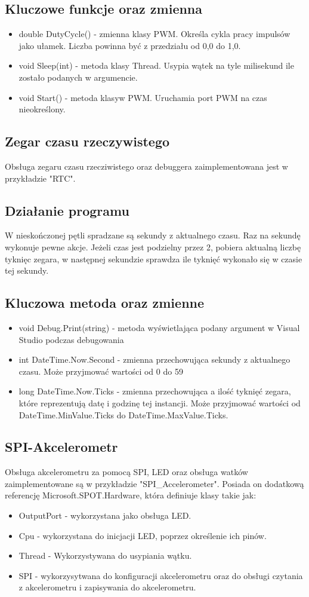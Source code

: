 \documentclass{article}
\begin{document}
\subsection*{Kluczowe funkcje oraz zmienna}
\begin{itemize}
\item double DutyCycle() - zmienna klasy PWM. Określa cykla pracy impulsów jako ułamek. Liczba powinna być z przedziału od 0,0 do 1,0.
\item void Sleep(int) - metoda klasy Thread. Usypia wątek na tyle milisekund ile zostało podanych w argumencie.
\item void Start() - metoda klasyw PWM. Uruchamia port PWM na czas nieokreślony.
\end{itemize}
\subsection{Zegar czasu rzeczywistego}
Obsługa zegaru czasu rzecziwistego oraz debuggera zaimplementowana jest w przykładzie "RTC".
\subsection*{Działanie programu}
W nieskończonej pętli spradzane są sekundy z aktualnego czasu. Raz na sekundę wykonuje pewne akcje. Jeżeli czas jest podzielny przez 2, pobiera aktualną liczbę tyknięc zegara, w następnej sekundzie sprawdza ile tyknięć wykonało się w czasie tej sekundy. 
\subsection*{Kluczowa metoda oraz zmienne}
\begin{itemize}
\item void Debug.Print(string) - metoda wyświetlająca podany argument w Visual Studio podczas debugowania
\item int DateTime.Now.Second - zmienna przechowująca sekundy z aktualnego czasu. Może przyjmować wartości od 0 do 59
\item long DateTime.Now.Ticks - zmienna przechowująca a ilość tyknięć zegara, które reprezentują datę i godzinę tej instancji. Może przyjmować wartości od DateTime.MinValue.Ticks do DateTime.MaxValue.Ticks.
\end{itemize}
\subsection{SPI-Akcelerometr}
Obsługa akcelerometru za pomocą SPI, LED oraz obsługa watków zaimplementowane są w przykładzie "SPI\_Accelerometer". Posiada on dodatkową referencję Microsoft.SPOT.Hardware, która definiuje klasy takie jak:
\begin{itemize}
\item OutputPort - wykorzystana jako obsługa LED.
\item Cpu - wykorzystana do inicjacji LED, poprzez określenie ich pinów.
\item Thread - Wykorzystywana do usypiania wątku.
\item SPI - wykorzysytwana do konfiguracji akcelerometru oraz do obsługi czytania z akcelerometru i zapisywania do akcelerometru.
\end{itemize}
\end{document}
